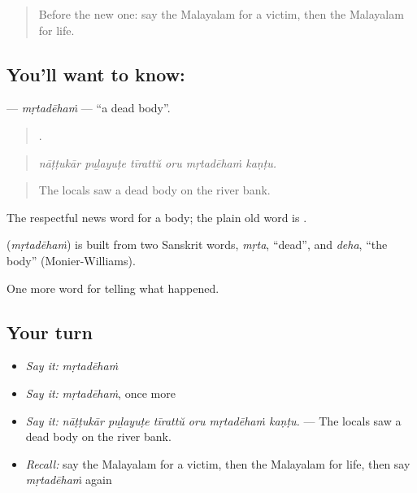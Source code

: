 \label{lesson:ML-C376-mrtadeham}



\begin{quote}
Before the new one: say the Malayalam for a victim, then the Malayalam for life.
\end{quote}

\subsection*{You'll want to know: }
\textbf{} — \emph{mṛtadēhaṁ} — \textquotedblleft{}a dead body\textquotedblright{}.

\begin{quote}
     .
\end{quote}

\begin{quote}
\emph{nāṭṭukār puḻayuṭe tīrattŭ oru mṛtadēhaṁ kaṇṭu.}
\end{quote}

\begin{quote}
The locals saw a dead body on the river bank.
\end{quote}

The respectful news word for a body; the plain old word is .

\begin{cousinweb}
\textbf{} (\emph{mṛtadēhaṁ}) is built from two Sanskrit words, \emph{mṛta}, \textquotedblleft{}dead\textquotedblright{}, and \emph{deha}, \textquotedblleft{}the body\textquotedblright{} (Monier-Williams).
\end{cousinweb}

\begin{grammarlens}[title={What you've built}]
One more word for telling what happened.
\end{grammarlens}

\subsection*{Your turn}
\begin{itemize}
\raggedright
  \item \emph{Say it:} \emph{mṛtadēhaṁ}
  \item \emph{Say it:} \emph{mṛtadēhaṁ}, once more
  \item \emph{Say it:} \emph{nāṭṭukār puḻayuṭe tīrattŭ oru mṛtadēhaṁ kaṇṭu.} — The locals saw a dead body on the river bank.
  \item \emph{Recall:} say the Malayalam for a victim, then the Malayalam for life, then say \emph{mṛtadēhaṁ} again
\end{itemize}

